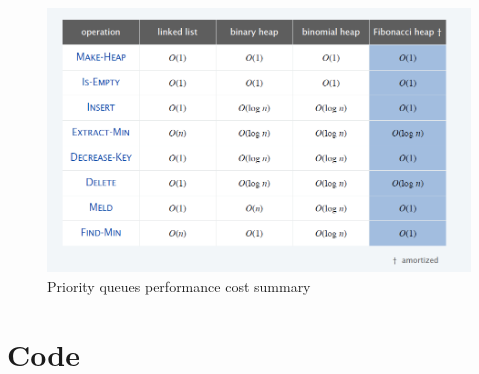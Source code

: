 \documentclass[a4paper]{article}
\begin{document}
\begin{figure}[htbp]
\centering
\includegraphics[scale=0.8]{p4.png}
\caption{Priority queues performance cost summary}
\end{figure}


\section{Code}
\end{document}

